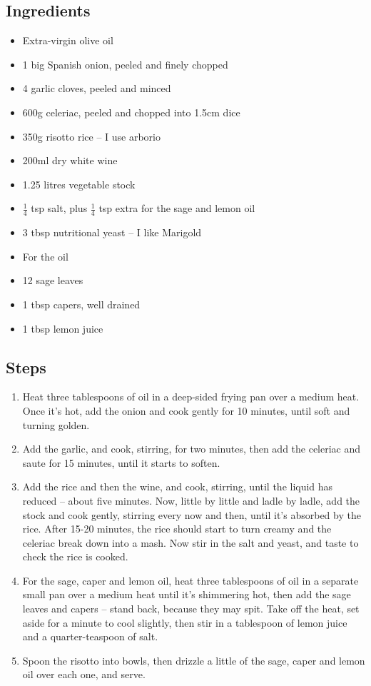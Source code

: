 \documentclass{book}
\begin{document}
\subsection*{Ingredients}
\begin{itemize}
\item Extra-virgin olive oil
\item 1 big Spanish onion, peeled and finely chopped
\item 4 garlic cloves, peeled and minced
\item 600g celeriac, peeled and chopped into 1.5cm dice
\item 350g risotto rice – I use arborio
\item 200ml dry white wine
\item 1.25 litres vegetable stock
\item $\frac{1}{4}$ tsp salt, plus $\frac{1}{4}$ tsp extra for the sage and lemon oil
\item 3 tbsp nutritional yeast – I like Marigold
\end{itemize}

\begin{itemize}
\item For the oil
\item 12 sage leaves
\item 1 tbsp capers, well drained
\item 1 tbsp lemon juice
\end{itemize}

\subsection*{Steps}
\begin{enumerate}
\item Heat three tablespoons of oil in a deep-sided frying pan over a medium heat. Once it’s hot, add the onion and cook gently for 10 minutes, until soft and turning golden.
\item Add the garlic, and cook, stirring, for two minutes, then add the celeriac and saute for 15 minutes, until it starts to soften.
\item Add the rice and then the wine, and cook, stirring, until the liquid has reduced – about five minutes. Now, little by little and ladle by ladle, add the stock and cook gently, stirring every now and then, until it’s absorbed by the rice. After 15-20 minutes, the rice should start to turn creamy and the celeriac break down into a mash. Now stir in the salt and yeast, and taste to check the rice is cooked.
\item For the sage, caper and lemon oil, heat three tablespoons of oil in a separate small pan over a medium heat until it’s shimmering hot, then add the sage leaves and capers – stand back, because they may spit. Take off the heat, set aside for a minute to cool slightly, then stir in a tablespoon of lemon juice and a quarter-teaspoon of salt.
\item Spoon the risotto into bowls, then drizzle a little of the sage, caper and lemon oil over each one, and serve.
\end{enumerate}
\newpage
\end{document}
